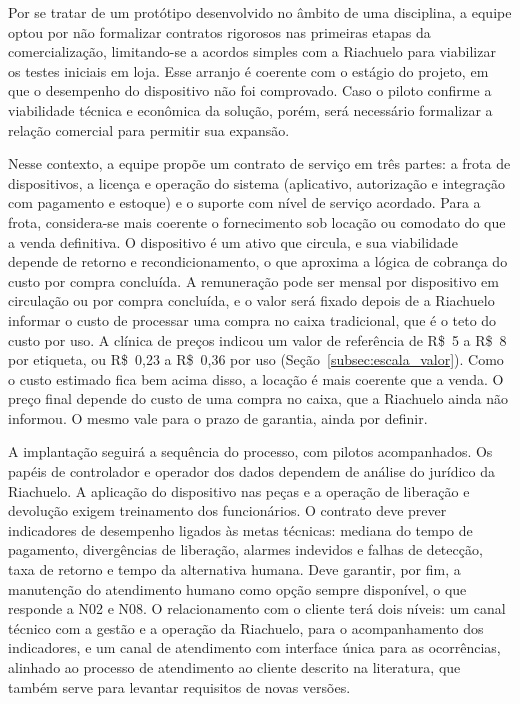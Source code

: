 Por se tratar de um protótipo desenvolvido no âmbito de uma disciplina, a equipe optou por não formalizar contratos rigorosos nas primeiras etapas da comercialização, limitando-se a acordos simples com a Riachuelo para viabilizar os testes iniciais em loja. Esse arranjo é coerente com o estágio do projeto, em que o desempenho do dispositivo não foi comprovado. Caso o piloto confirme a viabilidade técnica e econômica da solução, porém, será necessário formalizar a relação comercial para permitir sua expansão.

Nesse contexto, a equipe propõe um contrato de serviço em três partes: a frota de dispositivos, a licença e operação do sistema (aplicativo, autorização e integração com pagamento e estoque) e o suporte com nível de serviço acordado. Para a frota, considera-se mais coerente o fornecimento sob locação ou comodato do que a venda definitiva. O dispositivo é um ativo que circula, e sua viabilidade depende de retorno e recondicionamento, o que aproxima a lógica de cobrança do custo por compra concluída. A remuneração pode ser mensal por dispositivo em circulação ou por compra concluída, e o valor será fixado depois de a Riachuelo informar o custo de processar uma compra no caixa tradicional, que é o teto do custo por uso. A clínica de preços indicou um valor de referência de R\$~5 a R\$~8 por etiqueta, ou R\$~0,23 a R\$~0,36 por uso (Seção~\ref{subsec:escala_valor}). Como o custo estimado fica bem acima disso, a locação é mais coerente que a venda. O preço final depende do custo de uma compra no caixa, que a Riachuelo ainda não informou. O mesmo vale para o prazo de garantia, ainda por definir.

A implantação seguirá a sequência do processo, com pilotos acompanhados. Os papéis de controlador e operador dos dados dependem de análise do jurídico da Riachuelo. A aplicação do dispositivo nas peças e a operação de liberação e devolução exigem treinamento dos funcionários. O contrato deve prever indicadores de desempenho ligados às metas técnicas: mediana do tempo de pagamento, divergências de liberação, alarmes indevidos e falhas de detecção, taxa de retorno e tempo da alternativa humana. Deve garantir, por fim, a manutenção do atendimento humano como opção sempre disponível, o que responde a N02 e N08. O relacionamento com o cliente terá dois níveis: um canal técnico com a gestão e a operação da Riachuelo, para o acompanhamento dos indicadores, e um canal de atendimento com interface única para as ocorrências, alinhado ao processo de atendimento ao cliente descrito na literatura, que também serve para levantar requisitos de novas versões.

